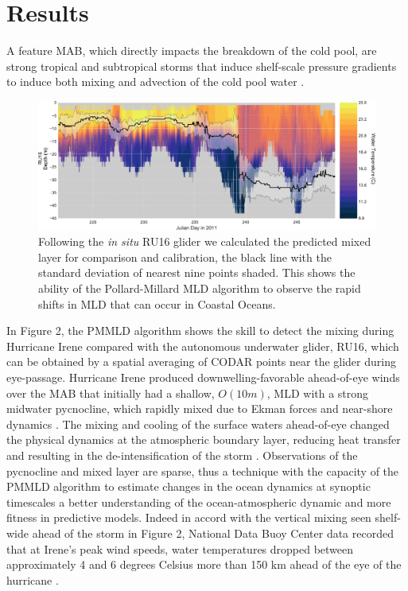 \documentclass{article}
\begin{document}
\section*{Results}
A feature MAB, which directly impacts the breakdown of the cold pool, are strong tropical and subtropical storms that induce shelf-scale pressure gradients to induce both mixing and advection of the cold pool water \cite{Austin2002,Miles2013}.
\begin{figure}[h]
\caption{Following the \textit{in situ} RU16 glider we calculated the predicted mixed layer for comparison and calibration, the black line with the standard deviation of nearest nine points shaded. This shows the ability of the Pollard-Millard MLD algorithm to observe the rapid shifts in MLD that can occur in Coastal Oceans.}
\centering
\includegraphics[width=1.0\textwidth,keepaspectratio]{CodarVglider_Irene.pdf}
\end{figure}
In Figure 2, the PMMLD algorithm shows the skill to detect the mixing during Hurricane Irene compared with the autonomous underwater glider, RU16, which can be obtained by a spatial averaging of CODAR points near the glider during eye-passage. 
Hurricane Irene produced downwelling-favorable ahead-of-eye winds over the MAB that initially had a shallow, $O(10m)$, MLD with a strong midwater pycnocline, which rapidly mixed due to Ekman forces and near-shore dynamics \cite{Austin2002}.
The mixing and cooling of the surface waters ahead-of-eye changed the physical dynamics at the atmospheric boundary layer, reducing heat transfer and resulting in the de-intensification of the storm \cite{Seroka2016}. 
Observations of the pycnocline and mixed layer are sparse, thus a technique with the capacity of the PMMLD algorithm to estimate changes in the ocean dynamics at synoptic timescales a better understanding of the ocean-atmospheric dynamic and more fitness in predictive models.
Indeed in accord with the vertical mixing seen shelf-wide ahead of the storm in Figure 2, National Data Buoy Center data recorded that at Irene’s peak wind speeds, water temperatures dropped between approximately 4 and 6 degrees Celsius more than 150 km ahead of the eye of the hurricane \cite{Seroka2016}.
\end{document}
